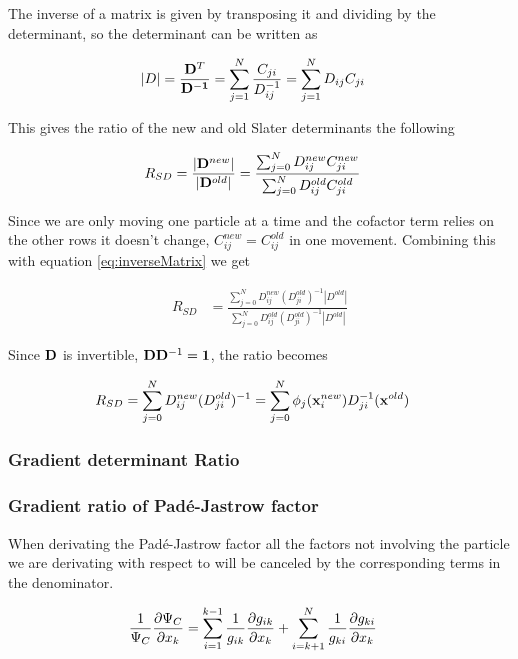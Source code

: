 \documentclass[x11names]{article}
\begin{document}
			The inverse of a matrix is given by transposing it and dividing by the determinant, so the determinant can be written as

			\begin{align}
				|D| &= \frac{\vb{D}^T}{\vb{D^{-1}}} = \sum_{j=1}^{N}{\frac{C_{ji}  }{ D^{-1}_{ij} } } = \sum_{j=1}^{N}{ D_{ij}C_{ji} }
				\label{eq:inverseMatrix}
			\end{align}

			This gives the ratio of the new and old Slater determinants the following

			\begin{align}
				R_{SD} &= \frac{|\vb{D}^{new}|}{|\vb{D}^{old}|} = \frac{\sum_{j=0}^N D_{ij}^{new} C_{ji}^{new} }{\sum_{j=0}^N D_{ij}^{old} C_{ji}^{old} }
			\end{align}

			Since we are only moving one particle at a time and the cofactor term relies on the other rows it doesn't change, \(C^{new}_{ij} = C^{old}_{ij}\) in one movement. Combining this with equation \eqref{eq:inverseMatrix} we get

			\begin{align}
				R_{SD} &=  \frac{\sum_{j=0}^N D_{ij}^{new} (D_{ji}^{old})^{-1} |D^{old}| }{\sum_{j=0}^N D_{ij}^{old} (D_{ji}^{old})^{-1} |D^{old}| }
			\end{align}

			Since \(\vb{D}\) is invertible, \(\vb{D}\vb{D}^{-1} = \vb{1}\), the ratio becomes

			\begin{align}
				R_{SD} &= \sum_{j = 0}^{N}D_{ij}^{new}(D_{ji}^{old})^{-1} = \sum_{j = 0}^{N} \phi_j(\vb{x}^{new}_i) D_{ji}^{-1}(\vb{x}^{old})
			\end{align}

		\subsubsection{Gradient determinant Ratio}

		


		\subsubsection{Gradient ratio of  Padé-Jastrow factor }
			When derivating the Padé-Jastrow factor all the factors not involving the particle we are derivating with respect to will be canceled by the corresponding terms in the denominator.

			\begin{align}
				\frac{1}{\Psi_C}\pdv{\Psi_C}{x_k} &= \sum_{i=1}^{k-1}\frac{1}{g_{ik}}\pdv{g_{ik}}{x_k} +  \sum_{i=k+1}^{N}\frac{1}{g_{ki}}\pdv{g_{ki}}{x_k}
			\end{align}
\end{document}
